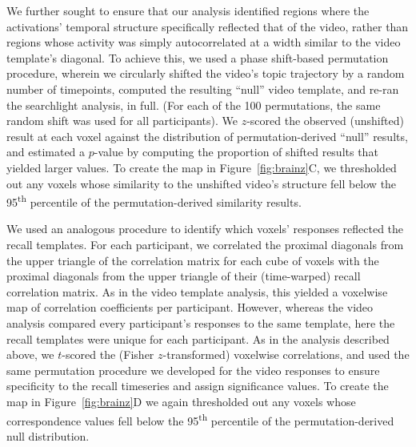 \documentclass{article}
\begin{document}
We further sought to ensure that our analysis identified regions where the activations’ temporal structure specifically reflected that of the video, rather than regions whose activity was simply autocorrelated at a width similar to the video template’s diagonal.  To achieve this, we used a phase shift-based permutation procedure, wherein we circularly shifted the video’s topic trajectory by a random number of timepoints, computed the resulting ``null” video template, and re-ran the searchlight analysis, in full.  (For each of the 100 permutations, the same random shift was used for all participants).  We $z$-scored the observed (unshifted) result at each voxel against the distribution of permutation-derived ``null” results, and estimated a $p$-value by computing the proportion of shifted results that yielded larger values.  To create the map in Figure~\ref{fig:brainz}C, we thresholded out any voxels whose similarity to the unshifted video’s structure fell below the 95\textsuperscript{th} percentile of the permutation-derived similarity results.

We used an analogous procedure to identify which voxels' responses reflected the recall templates.  For each participant, we correlated the proximal diagonals from the upper triangle of the correlation matrix for each cube of voxels with the proximal diagonals from the upper triangle of their (time-warped) recall correlation matrix.  As in the video template analysis, this yielded a voxelwise map of correlation coefficients per participant.  However, whereas the video analysis compared every participant's responses to the same template, here the recall templates were unique for each participant.  As in the analysis described above, we $t$-scored the (Fisher $z$-transformed) voxelwise correlations, and used the same permutation procedure we developed for the video responses to ensure specificity to the recall timeseries and assign significance values.  To create the map in Figure~\ref{fig:brainz}D we again thresholded out any voxels whose correspondence values fell below the 95\textsuperscript{th} percentile of the permutation-derived null distribution.
\end{document}
